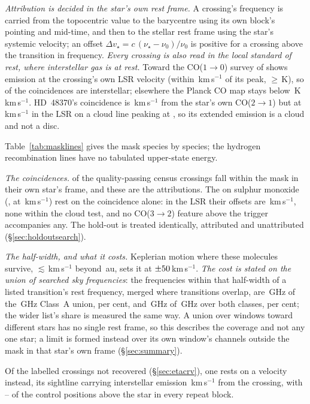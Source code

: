 \emph{Attribution is decided in the star's own rest frame.} A crossing's
frequency is carried from the topocentric value to the barycentre using its
own block's pointing and mid-time, and then to the stellar rest frame using
the star's systemic velocity; an offset $\Delta v_\star =
c\,(\nu_\star-\nu_0)/\nu_0$ is positive for a crossing above the transition
in frequency. \emph{Every crossing is also read in the local standard of rest,
where interstellar gas is at rest.} Toward \LsCloudStars{} the CO($1\to0$)
survey of \citet{DameThaddeus2022,Dame2001} shows emission at the crossing's
own LSR velocity (within \LsCloudDvMax\,km\,s$^{-1}$ of its peak,
$\ge$\LsCloudTMin\,K), so \LsNCloud{} of the \MkNCoinc{} coincidences are
interstellar; elsewhere the Planck CO map \citep{PlanckCO2016} stays below
\LsPlanckMax\,K\,km\,s$^{-1}$. HD~48370's coincidence is
\LsHdDvStar\,km\,s$^{-1}$ from the star's own CO($2\to1$) but at
\LsHdVfeat\,km\,s$^{-1}$ in the LSR on a cloud line peaking at \LsHdVco, so
its extended emission is a cloud and not a disc.

Table~\ref{tab:masklines} gives the mask species by species; the hydrogen
recombination lines have no tabulated upper-state energy.

\begin{table}
\centering
\footnotesize
\caption{The line mask, by species: the number $N$ of transitions, the
frequency range they span inside the searched intervals and their
upper-state energies.}
\label{tab:masklines}

\end{table}

\emph{The coincidences.} \MkNCoinc{} of the
\CsNCrossQp{} quality-passing census crossings fall within the mask in their own star's frame, and these
are the \MkAttr{} attributions. The \SoNCrossWord{} on sulphur monoxide
(\SoStars, at \SoDvList\,km\,s$^{-1}$) rest on the coincidence alone: in the
LSR their offsets are \SoDvLsrList\,km\,s$^{-1}$, none within the cloud test,
and no CO($3\to2$) feature above the trigger accompanies any.
The hold-out is treated identically, \HoNAttr{} attributed and \HoNUnattr{}
unattributed (\S\ref{sec:holdoutsearch}).

\emph{The half-width, and what it costs.} Keplerian motion where these
molecules survive, $\lesssim$\EcKepVKms\,km\,s$^{-1}$ beyond \EcKepRAu\,au, sets it at
$\pm50$\,km\,s$^{-1}$. \emph{The cost is stated on the union of
searched sky frequencies}: the frequencies within that half-width of a
listed transition's rest frequency, merged where transitions overlap, are \MkMaskAGHz\,GHz of the
\CvUnionA\,GHz Class~A union, \MkMaskAPct{} per cent, and \FrMaskLostGHz\,GHz
of \FrMaskUnionGHz\,GHz over both classes, \FrMaskPct{} per cent; the wider
list's share is measured the same way. A union over windows toward different
stars has no single rest frame, so this describes the coverage and not any one
star; a limit is formed instead over its own window's channels outside the
mask in that star's own frame (\S\ref{sec:summary}).

Of the \MkAttrExcl{} labelled crossings not recovered (\S\ref{sec:etacrv}),
one rests on a velocity instead, its sightline carrying interstellar emission
\LsLupDv\,km\,s$^{-1}$ from the crossing, with \RqAjNgeLo--\RqAjNgeHi{} of
the \NCtrl{} control positions above the star in every repeat block.
